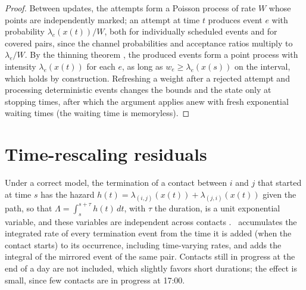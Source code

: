 \begin{proof}
Between updates, the attempts form a Poisson process of rate $W$ whose points are independently marked; an attempt at time $t$ produces event $e$ with probability $\lambda_e(x(t))/W$, both for individually scheduled events and for covered pairs, since the channel probabilities and acceptance ratios multiply to $\lambda_e/W$.
By the thinning theorem \citep{lewis1979,ogata1981}, the produced events form a point process with intensity $\lambda_e(x(t))$ for each $e$, as long as $w_e \ge \lambda_e(x(s))$ on the interval, which holds by construction.
Refreshing a weight after a rejected attempt and processing deterministic events changes the bounds and the state only at stopping times, after which the argument applies anew with fresh exponential waiting times (the waiting time is memoryless).
\end{proof}

\section{Time-rescaling residuals}\label{app:residuals}
Under a correct model, the termination of a contact between $i$ and $j$ that started at time $s$ has the hazard $h(t) = \lambda_{(i,j)}(x(t)) + \lambda_{(j,i)}(x(t))$ given the path, so that $\Lambda = \int_s^{s+\tau} h(t)\,dt$, with $\tau$ the duration, is a unit exponential variable, and these variables are independent across contacts \citep{brown2002}.
\tricl\ accumulates the integrated rate of every termination event from the time it is added (when the contact starts) to its occurrence, including time-varying rates, and adds the integral of the mirrored event of the same pair.
Contacts still in progress at the end of a day are not included, which slightly favors short durations; the effect is small, since few contacts are in progress at 17:00.

